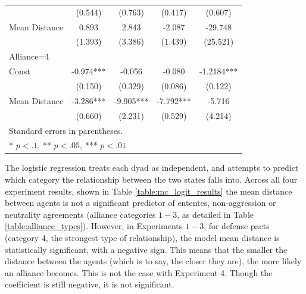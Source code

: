 \begin{table}
\begin{center}
\begin{tabular}{lcccc}
                & (0.544)      & (0.763)      & (0.417)      & (0.607)      \\
  Mean Distance & 0.893        & 2.843        & -2.087       & -29.748      \\
                & (1.393)      & (3.386)      & (1.439)      & (25.521)     \\
  \hline
  \multicolumn{5}{l}{Alliance=4}                                            \\
  \hline
  Const         & -0.974***    & -0.056       & -0.080       & -1.2184***   \\
                & (0.150)      & (0.329)      & (0.086)      & (0.122)      \\
  Mean Distance & -3.286***    & -9.905***    & -7.792***    & -5.716       \\
                & (0.660)      & (2.231)      & (0.529)      & (4.214)      \\
  \hline
  \hline
  \multicolumn{5}{l}{Standard errors in parentheses.} \\
  \multicolumn{5}{l}{* $p<.1$, ** $p<.05$, *** $p<.01$} \\
  \end{tabular}
  \end{center}
  \tableSpace
\end{table}

The logistic regression treats each dyad as independent, and attempts to predict which category the relationship between the two states falls into. Across all four experiment results, shown in Table \ref{table:mc_logit_results} the mean distance between agents is not a significant predictor of ententes, non-aggression or neutrality agreements (alliance categories $1-3$, as detailed in Table \ref{table:alliance_types}). However, in Experiments $1-3$, for defense pacts (category 4, the strongest type of relationship), the model mean distance is statistically significant, with a negative sign. This means that the smaller the distance between the agents (which is to say, the closer they are), the more likely an alliance becomes. This is not the case with Experiment 4. Though the coefficient is still negative, it is not significant.

